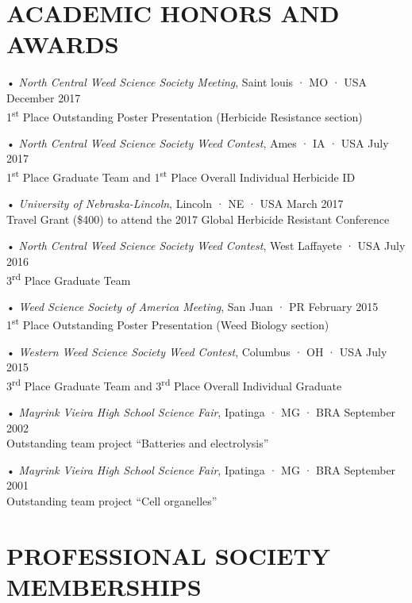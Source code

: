 \documentclass[11pt,]{article}
\begin{document}
\hypertarget{academic-honors-and-awards}{%
\section{ACADEMIC HONORS AND AWARDS}\label{academic-honors-and-awards}}

• \emph{North Central Weed Science Society Meeting}, Saint louis · MO ·
USA \hfill December 2017\\
1\textsuperscript{st} Place Outstanding Poster Presentation (Herbicide
Resistance section)

• \emph{North Central Weed Science Society Weed Contest}, Ames · IA ·
USA \hfill July 2017\\
1\textsuperscript{st} Place Graduate Team and 1\textsuperscript{st}
Place Overall Individual Herbicide ID

• \emph{University of Nebraska-Lincoln}, Lincoln · NE · USA \hfill March
2017\\
Travel Grant (\$400) to attend the 2017 Global Herbicide Resistant
Conference

• \emph{North Central Weed Science Society Weed Contest}, West Laffayete
· USA \hfill July 2016\\
3\textsuperscript{rd} Place Graduate Team

• \emph{Weed Science Society of America Meeting}, San Juan · PR
\hfill February 2015\\
1\textsuperscript{st} Place Outstanding Poster Presentation (Weed
Biology section)

• \emph{Western Weed Science Society Weed Contest}, Columbus · OH · USA
\hfill July 2015\\
3\textsuperscript{rd} Place Graduate Team and 3\textsuperscript{rd}
Place Overall Individual Graduate

• \emph{Mayrink Vieira High School Science Fair}, Ipatinga · MG · BRA
\hfill September 2002\\
Outstanding team project ``Batteries and electrolysis''

• \emph{Mayrink Vieira High School Science Fair}, Ipatinga · MG · BRA
\hfill September 2001\\
Outstanding team project ``Cell organelles''

\newpage

\hypertarget{professional-society-memberships}{%
\section{PROFESSIONAL SOCIETY
MEMBERSHIPS}\label{professional-society-memberships}}
\end{document}
